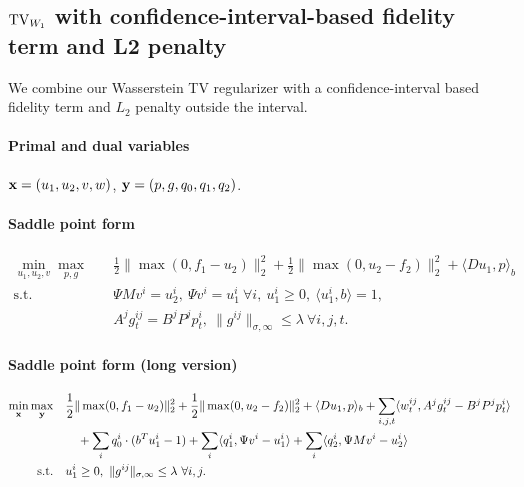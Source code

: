 
\subsection{$\operatorname{TV}_{W_1}$ with confidence-interval-based fidelity term and L2 penalty}

We combine our Wasserstein TV regularizer with a confidence-interval based
fidelity term and $L_2$ penalty outside the interval.

\paragraph{Primal and dual variables}
$\mathbf{x} = (u_1,u_2,v,w)$, $\mathbf{y} = (p,g,q_0,q_1,q_2)$.

\paragraph{Saddle point form}
\begin{align*}
    \min_{u_1,u_2,v} \max_{p,g} \quad
        & \frac{1}{2} \|\max(0, f_1 - u_2)\|_2^2
          + \frac{1}{2} \|\max(0, u_2 - f_2)\|_2^2
          + \langle Du_1, p \rangle_b \\
    \text{s.t.}\quad
        & \Psi M v^i = u_2^i, ~\Psi v^i = u_1^i ~\forall i,
          ~u_1^i \geq 0, ~\langle u_1^i, b \rangle = 1, \\
        & A^j g^{ij}_t = B^j P^j p^i_t,
          ~\|g^{ij}\|_{\sigma,\infty} \leq \lambda ~\forall i,j,t.
\end{align*}

\paragraph{Saddle point form (long version)}
\begin{align*}
    \min_{\mathbf{x}} \max_{\mathbf{y}} \quad
        & \frac{1}{2} \|\max(0, f_1 - u_2)\|_2^2
            + \frac{1}{2} \|\max(0, u_2 - f_2)\|_2^2
            + \langle Du_1, p \rangle_b
            + \sum_{i,j,t} \langle w^{ij}_t, A^j g^{ij}_t - B^j P^j p^i_t \rangle\\
        &\quad + \sum_{i} q_0^i \cdot (b^T u_1^i - 1)
            + \sum_{i} \langle q_1^i, \Psi v^i - u_1^i \rangle
            + \sum_{i} \langle q_2^i, \Psi M v^i - u_2^i \rangle \\
    \text{s.t.}\quad
        & u_1^i \geq 0, ~\|g^{ij}\|_{\sigma,\infty} \leq \lambda ~\forall i,j.
\end{align*}

